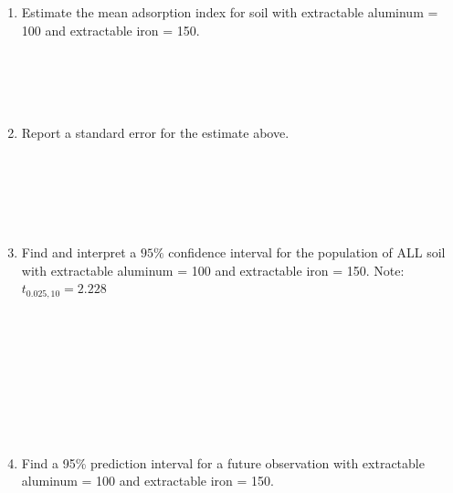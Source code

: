 \begin{enumerate}
\item Estimate the mean adsorption index for soil with extractable aluminum = 100 and extractable iron = 150.  \\~\\~\\~\\~\\
\item Report a standard error for the estimate above.\\~\\~\\~\\~\\~\\
\item Find and interpret a $95\%$ confidence interval for the population of ALL soil with extractable aluminum = 100 and extractable iron = 150.  Note: $t_{0.025, 10}=2.228$\\~\\~\\~\\~\\~\\~\\~\\~\\
\item Find a 95\% prediction interval for a future observation with extractable aluminum = 100 and extractable iron = 150.  \\
\end{enumerate}


